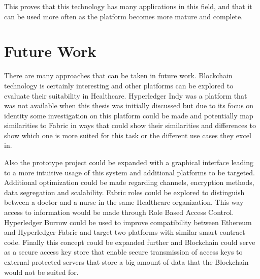 This proves that this technology has many applications in this field, and that
it can be used more often as the platform becomes more mature and complete.

\section{Future Work}

There are many approaches that can be taken in future work. Blockchain
technology is certainly interesting and other platforms can be explored to
evaluate their suitability in Healthcare. Hyperledger Indy was a platform that
was not available when this thesis was initially discussed but due to its focus
on identity some investigation on this platform could be made and potentially
map similarities to Fabric in ways that could show their similarities and
differences to show which one is more suited for this task or the different use
cases they excel in.

Also the prototype project could be expanded with a graphical interface leading
to a more intuitive usage of this system and additional platforms to be
targeted. Additional optimization could be made regarding channels, encryption
methods, data segregation and scalability. Fabric roles could be explored to
distinguish between a doctor and a nurse in the same Healthcare organization.
This way access to information would be made through Role Based Access Control.
Hyperledger Burrow could be used to improve compatibility between Ethereum and
Hyperledger Fabric and target two platforms with similar smart contract code.
Finally this concept could be expanded further and Blockchain could serve as a
secure access key store that enable secure transmission of access keys to
external protected servers that store a big amount of data that the Blockchain
would not be suited for.
